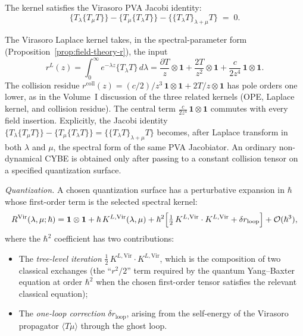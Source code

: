 The kernel satisfies the Virasoro PVA Jacobi identity:
\begin{equation}
\label{eq:vir-CYBE}
\{T_\lambda\{T_\mu T\}\}
-\{T_\mu\{T_\lambda T\}\}
-\{\{T_\lambda T\}_{\lambda+\mu}T\}
\;=\;0.
\end{equation}

\begin{computation}
\label{comp:vir-CYBE}
The Virasoro Laplace kernel takes, in the spectral-parameter form
(Proposition~\ref{prop:field-theory-r}), the input
\[
r^L(z)
= \int_0^\infty e^{-\lambda z} \{T_\lambda T\}\,d\lambda
= \frac{\partial T}{z} \otimes \mathbf{1}
 + \frac{2T}{z^2} \otimes \mathbf{1}
 + \frac{c}{2z^4}\,\mathbf{1}\otimes\mathbf{1}.
\]
The collision residue $r^{\mathrm{coll}}(z) = (c/2)/z^3\,
\mathbf{1}\otimes\mathbf{1} + 2T/z\otimes\mathbf{1}$ has pole
orders one lower, as in the Volume~I discussion of the three related
kernels (OPE, Laplace kernel, and collision residue).
The central term $\frac{c}{2z^4}\,\mathbf{1}\otimes\mathbf{1}$
commutes with every field insertion.
Explicitly, the Jacobi identity
$\{T_\lambda\{T_\mu T\}\} - \{T_\mu\{T_\lambda T\}\}
= \{\{T_\lambda T\}_{\lambda+\mu} T\}$
becomes, after Laplace transform in both $\lambda$ and $\mu$,
the spectral form of the same PVA Jacobiator. An ordinary
non-dynamical CYBE is obtained only after passing to a constant
collision tensor on a specified quantization surface.
\end{computation}

\medskip
\noindent\emph{Quantization.}
A chosen quantization surface has a perturbative expansion in
$\hbar$ whose first-order term is the selected spectral kernel:
\begin{equation}
\label{eq:vir-R-expansion}
R^{\text{Vir}}(\lambda, \mu; \hbar)
= \mathbf{1} \otimes \mathbf{1}
 + \hbar\, K^{L,\text{Vir}}(\lambda,\mu)
 + \hbar^2 \Bigl[\tfrac{1}{2}\, K^{L,\text{Vir}} \cdot K^{L,\text{Vir}}
 + \delta r_{\text{loop}}\Bigr]
 + \mathcal{O}(\hbar^3),
\end{equation}
where the $\hbar^2$ coefficient has two contributions:
\begin{itemize}
\item The \emph{tree-level iteration}
$\tfrac{1}{2}\,K^{L,\text{Vir}} \cdot K^{L,\text{Vir}}$, which is
the composition of two classical exchanges (the ``$r^2/2$''
term required by the quantum Yang--Baxter equation at order
$\hbar^2$ when the chosen first-order tensor satisfies the relevant
classical equation);
\item The \emph{one-loop correction} $\delta r_{\text{loop}}$,
arising from the self-energy of the Virasoro propagator
$\langle T\mu \rangle$ through the ghost loop.
\end{itemize}

